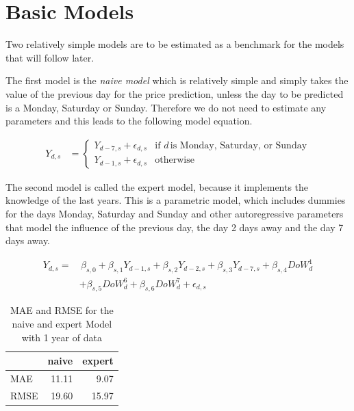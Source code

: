 \documentclass[12pt,a4paper]{article}
\begin{document}
\hypertarget{basic-models}{%
\section{Basic Models}\label{basic-models}}

Two relatively simple models are to be estimated as a benchmark for the
models that will follow later.

The first model is the \emph{naive model} which is relatively simple and
simply takes the value of the previous day for the price prediction,
unless the day to be predicted is a Monday, Saturday or Sunday.
Therefore we do not need to estimate any parameters and this leads to
the following model equation.

\begin{align*}
 Y_{d,s} &=
  \begin{cases}
   Y_{d-7, s} + \epsilon_{d,s}       & \text{if } d \, \text{is Monday, Saturday, or Sunday}\\
   Y_{d-1, s} + \epsilon_{d,s}        & \text{otherwise}
  \end{cases}
\end{align*}

The second model is called the expert model, because it implements the
knowledge of the last years. This is a parametric model, which includes
dummies for the days Monday, Saturday and Sunday and other
autoregressive parameters that model the influence of the previous day,
the day 2 days away and the day 7 days away.

\begin{align*}
 Y_{d,s} = &  \, \beta_{s,0 } + \beta_{s,1 } Y_{ d-1,s} + \beta_{s,2 } Y_{ d-2,s} + \beta_{s,3 } Y_{ d-7,s} + \beta_{s,4 } DoW^1_{d}    \\
  & + \beta_{s,5 } DoW^6_{d} +\beta_{s,6 } DoW^7_{d} + \epsilon_{d,s}
\end{align*}

\begin{table}[!h]

\caption{\label{tab:expert model}\label{tab:expert} MAE and RMSE for the naive and expert Model with 1 year of data}
\centering
\begin{tabular}{lrr}
\toprule
  & naive & expert\\
\midrule
\rowcolor{gray!6}  MAE & 11.11 & 9.07\\
RMSE & 19.60 & 15.97\\
\bottomrule
\end{tabular}
\end{table}
\end{document}
